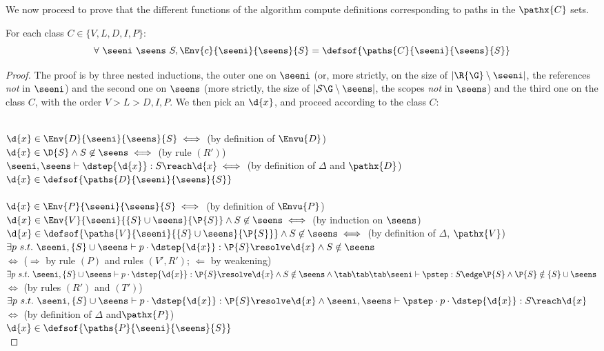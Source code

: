 We now proceed to prove that the different functions of the algorithm compute definitions corresponding to paths in the $\pathx{C}$ sets.
\begin{lemma}
For each class $C \in \{V,L,D,I,P\}$: 
\begin{equation*}
\forall\ \seeni\ \seens\ S, \Env{c}{\seeni}{\seens}{S} = \defsof{\paths{C}{\seeni}{\seens}{S}}
\end{equation*}
\end{lemma}
\begin{proof}
The proof is by three nested inductions,
the outer one on $\seeni$ (or, more strictly, on the size of \mbox{$|\R{\G} \setminus \seeni|$}, the references
\emph{not} in $\seeni$) and the second one on $\seens$ (more strictly, the size of \mbox{$|\S{\G} \setminus \seens|$}, 
the scopes \emph{not} in $\seens$) and the third one on the class $C$, with the order $V > L > D,I,P$.
We then pick an $\d{x}$, and proceed according to the class $C$:\smallskip

\noindent {} \\
$\d{x} \in \Env{D}{\seeni}{\seens}{S} \iff$ (by definition of $\Envu{D}$) \\
$\d{x} \in \D{S} \wedge S \not\in \seens \iff$ (by rule $(R')$)\\
$\seeni,\seens\vdash \dstep{\d{x}} : S \reach \d{x} \iff$ (by definition of $\Delta$ and $\pathx{D}$)\\
$\d{x} \in \defsof{\paths{D}{\seeni}{\seens}{S}}$\\

\noindent {}\\
$\d{x} \in \Env{P}{\seeni}{\seens}{S} \iff$ (by definition of $\Envu{P}$) \\
$\d{x} \in \Env{V}{\seeni}{\{S\} \cup \seens}{\P{S}} \wedge S \not\in \seens \iff$ (by induction on $\seens$)\\
$\d{x} \in \defsof{\paths{V}{\seeni}{\{S\} \cup \seens}{\P{S}}} \wedge S \not\in \seens \iff$ (by definition of $\Delta$, $\pathx{V}$)\\
$\exists p\ s.t.\ \seeni,\{S\}\cup\seens \vdash p \cdot \dstep{\d{x}} : \P{S} \resolve \d{x} \wedge S \notin \seens$\\ 
\tab $\iff$ ($\Longrightarrow$ by rule $(P)$  and rules $(V',R')$; $\Longleftarrow$ by weakening)\\
$\exists p\ s.t.\ \seeni,\{S\}\cup\seens \vdash p \cdot \dstep{\d{x}} : \P{S} \resolve \d{x} \wedge S \notin \seens \wedge \\
\tab\tab\tab\seeni \vdash \pstep : S \edge \P{S} \wedge \P{S} \notin \{S\}\cup \seens$\\ 
\tab $\iff$ (by rules $(R')$ and $(T')$)\\
$\exists p\ s.t.\ \seeni,\{S\}\cup\seens \vdash p \cdot \dstep{\d{x}} : \P{S} \resolve \d{x} \wedge \seeni,\seens \vdash \pstep\cdot p\cdot \dstep{\d{x}} : S \reach \d{x}$ \\
\tab$ \iff$ (by definition of $\Delta$ and$\pathx{P}$)\\
$ \d{x} \in \defsof{\paths{P}{\seeni}{\seens}{S}}$\\


\end{proof}
